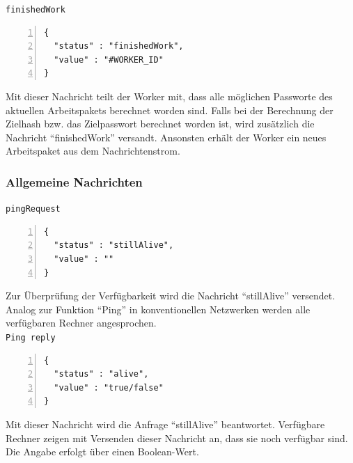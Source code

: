 \texttt{finishedWork}
\begin{lstlisting}[basicstyle=\ttfamily,numbers=left,numberstyle=\footnotesize\ttfamily,backgroundcolor=\color{sourcegray}]
{
  "status" : "finishedWork",
  "value" : "#WORKER_ID"
}
\end{lstlisting}
Mit dieser Nachricht teilt der Worker mit, dass alle möglichen Passworte des aktuellen Arbeitspakets berechnet worden sind. Falls bei der Berechnung der Zielhash bzw. das Zielpasswort berechnet worden ist, wird zusätzlich die Nachricht \enquote{finishedWork} versandt. Ansonsten erhält der Worker ein neues Arbeitspaket aus dem Nachrichtenstrom. \\

\subsubsection{Allgemeine Nachrichten}

\texttt{pingRequest}
\begin{lstlisting}[basicstyle=\ttfamily,numbers=left,numberstyle=\footnotesize\ttfamily,backgroundcolor=\color{sourcegray}]
{
  "status" : "stillAlive",
  "value" : ""
}
\end{lstlisting}
Zur Überprüfung der Verfügbarkeit wird die Nachricht \enquote{stillAlive} versendet. Analog zur Funktion \enquote{Ping} in konventionellen Netzwerken werden alle verfügbaren Rechner angesprochen.  \\

\texttt{Ping reply}
\begin{lstlisting}[basicstyle=\ttfamily,numbers=left,numberstyle=\footnotesize\ttfamily,backgroundcolor=\color{sourcegray}]
{
  "status" : "alive",
  "value" : "true/false"
}
\end{lstlisting}
Mit dieser Nachricht wird die Anfrage \enquote{stillAlive} beantwortet. Verfügbare Rechner zeigen mit Versenden dieser Nachricht an, dass sie noch verfügbar sind. Die Angabe erfolgt über einen Boolean-Wert.\\

